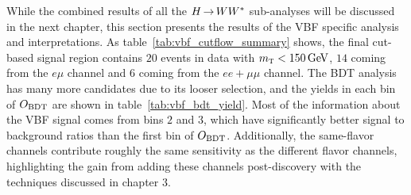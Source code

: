 While the combined results of all the $H{\,{\rightarrow}\,}WW^\ast$ sub-analyses will be discussed in the next chapter, this section presents the results of the VBF specific analysis and interpretations. As table~\ref{tab:vbf_cutflow_summary} shows, the final cut-based signal region contains $20$ events in data with $\mTH < 150 \GeV$, $14$ coming from the $e\mu$ channel and $6$ coming from the $ee+\mu\mu$ channel. The BDT analysis has many more candidates due to its looser selection, and the yields in each bin of $O_{\rm BDT}$ are shown in table~\ref{tab:vbf_bdt_yield}. Most of the information about the VBF signal comes from bins $2$ and $3$, which have significantly better signal to background ratios than the first bin of $O_{\rm BDT}$. Additionally, the same-flavor channels contribute roughly the same sensitivity as the different flavor channels, highlighting the gain from adding these channels post-discovery with the techniques discussed in chapter 3. 

